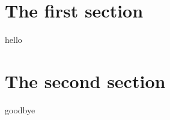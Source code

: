\documentclass{article}
\begin{document}
\section{The first section}
hello
\newpage
\section{The second section}
\hypertarget{TestTarget}{goodbye}
\end{document}
